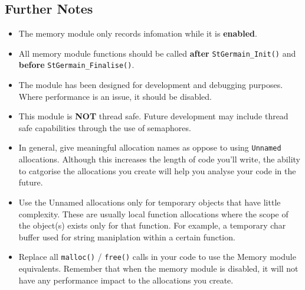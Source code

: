 \documentclass[a4paper,12pt]{article}
\begin{document}
\subsection{Further Notes}
\begin{itemize}
\item The memory module only records infomation while it is \textbf{enabled}.
\item All memory module functions should be called \textbf{after} \texttt{StGermain\_Init()} and \textbf{before} \texttt{StGermain\_Finalise()}.
\item The module has been designed for development and debugging purposes. Where performance is an issue, it should be disabled.
\item This module is {\bf NOT} thread safe. Future development may include thread safe capabilities through the use of semaphores.
\item In general, give meaningful allocation names as oppose to using \texttt{Unnamed} allocations. Although this increases the length of code you'll write, the ability to catgorise the allocations you create will help you analyse your code in the future.
\item Use the Unnamed allocations only for temporary objects that have little complexity. These are usually local function allocations where the scope of the object(s) exists only for that function. For example, a temporary char buffer used for string maniplation within a certain function.
\item Replace all \texttt{malloc()} / \texttt{free()} calls in your code to use the Memory module equivalents. Remember that when the memory module is disabled, it will not have any performance impact to the allocations you create.
\end{itemize}
\end{document}
